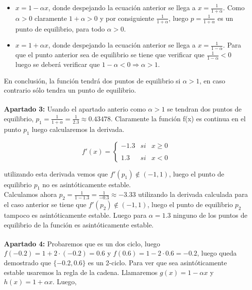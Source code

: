 \documentclass{article}
\begin{document}
\begin{itemize}
\item $x = 1 - \alpha x$, donde despejando la ecuación anterior se llega a $x = \frac{1}{1+\alpha}$. Como $\alpha > 0$ claramente $1 + \alpha > 0$ y por consiguiente $\frac{1}{1+\alpha}$, luego $p = \frac{1}{1 + \alpha}$ es un punto de equilibrio, para todo $\alpha > 0$.

\item $x = 1 + \alpha x$, donde despejando la ecuación anterior se llega a $x = \frac{1}{1 - \alpha}$. Para que el punto anterior sea de equilibrio se tiene que verificar que $\frac{1}{1 - \alpha} < 0$ luego se deberá verificar que $1 - \alpha < 0 \Rightarrow \alpha > 1$.
\end{itemize}

En conclusión, la función tendrá dos puntos de equilibrio si $\alpha > 1$, en caso contrario sólo tendra un punto de equilibrio. \\ \\

\textbf{Apartado 3:} Usando el apartado anterio como $\alpha > 1$ se tendran dos puntos de equilibrio, $p_1 = \frac{1}{1 + \alpha} = \frac{1}{2.3} \approx 0.43478$. Claramente la función f(x) es continua en el punto $p_1$ luego calcularemos la derivada.

\begin{equation*}
f'(x)= \left\{ \begin{array}{lcc}
             -1.3 &   si  & x \geq 0 \\
             \\ 1.3 &  si & x < 0
             \end{array}
   \right.
\end{equation*}

utilizando esta derivada vemos que $f'(p_1) \notin (-1,1)$, luego el punto de equilibrio $p_1$ no es asintóticamente estable. \\

Calculamos ahora $p_2 = \frac{1}{1-1.3}= \frac{1}{-0.3} \approx -3.33$ utilizando la derivada calculada para el caso anterior se tiene que $f'(p_2) \notin (-1,1)$, luego el punto de equilibrio $p_2$ tampoco es asintóticamente estable. Luego para $\alpha = 1.3$ ninguno de los puntos de equilibrio de la función es asintóticamente estable. \\ \\

\textbf{Apartado 4:} Probaremos que es un dos ciclo, luego $f(-0.2) = 1 + 2\cdot(-0.2) = 0.6$ y $f(0.6)= 1 - 2\cdot0.6 = -0.2$, luego queda demostrado que $\{-0.2,0.6\}$ es un 2-ciclo. Para ver que sea asintóticamente estable usaremos la regla de la cadena. Llamaremos $g(x) = 1 - \alpha x$ y $h(x) = 1 + \alpha x$. Luego,
\end{document}
